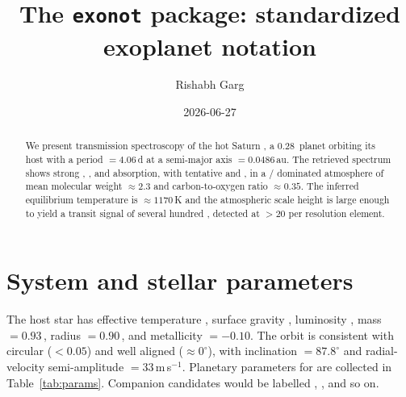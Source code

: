 \documentclass{article}
\title{The \texttt{exonot} package: standardized exoplanet notation}
\author{Rishabh Garg}
\date{2026-06-27}
\begin{document}
\maketitle

\begin{abstract}
We present transmission spectroscopy of the hot Saturn
, a \ensuremath{0.28}\,\Mjup{} planet orbiting its
host  with a period \Porb${}=4.06$\,d at a semi-major axis
\aorb${}=0.0486$\,au.  The retrieved spectrum shows strong \HO{},
\COtwo, and \SOtwo{} absorption, with tentative \CO{} and \CH, in a
\Htwo/\Helium{} dominated atmosphere of mean molecular weight
\mmw${}\approx2.3$ and carbon-to-oxygen ratio \CtoO${}\approx0.35$.  The
inferred equilibrium temperature is \Teq${}\approx1170$\,K and the
atmospheric scale height \Hatm{} is large enough to yield a transit
signal of several hundred \ppm{}, detected at \snr${}>20$ per
resolution element.
\end{abstract}

\section{System and stellar parameters}

The host star  has effective temperature \Teff, surface gravity
\logg, luminosity \Lsun, mass \Mstar${}=0.93$\,\Msun, radius
\Rstar${}=0.90$\,\Rsun, and metallicity \FeH${}=-0.10$.  The orbit is
consistent with circular (\ecc${}<0.05$) and well aligned
(\obliq${}\approx0^\circ$), with inclination \inc${}=87.8^\circ$ and
radial-velocity semi-amplitude \Krv${}=33$\,m\,s$^{-1}$.  Planetary
parameters for  are collected in
Table~\ref{tab:params}.  Companion candidates would be labelled
, , and so on.
\end{document}

